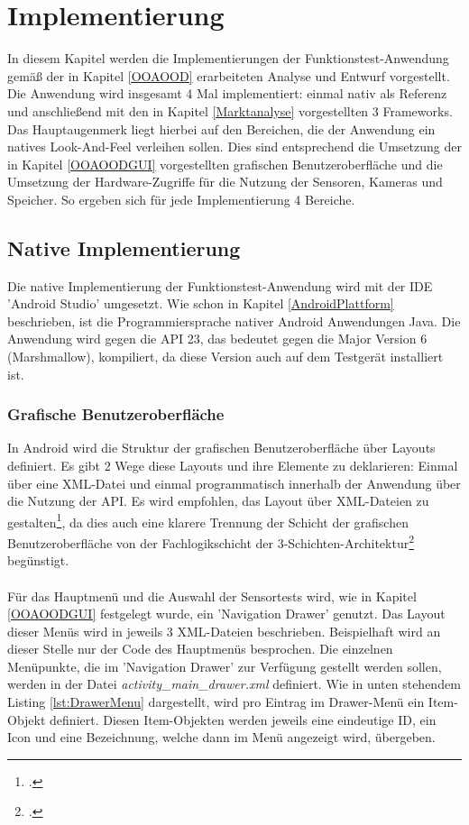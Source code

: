 \chapter{Implementierung}

In diesem Kapitel werden die Implementierungen der Funktionstest-Anwendung gemäß der in Kapitel \ref{OOAOOD} erarbeiteten Analyse und Entwurf vorgestellt. Die Anwendung wird insgesamt 4 Mal implementiert: einmal nativ als Referenz und anschließend mit den in Kapitel \ref{Marktanalyse}  vorgestellten 3 Frameworks. Das Hauptaugenmerk liegt hierbei auf den Bereichen, die der Anwendung ein natives Look-And-Feel verleihen sollen. Dies sind entsprechend die Umsetzung der in Kapitel \ref{OOAOODGUI} vorgestellten grafischen Benutzeroberfläche und die Umsetzung der Hardware-Zugriffe für die Nutzung der Sensoren, Kameras und Speicher. So ergeben sich für jede Implementierung 4 Bereiche.

\section{Native Implementierung}

Die native Implementierung der Funktionstest-Anwendung wird mit der IDE 'Android Studio' umgesetzt. Wie schon in Kapitel \ref{AndroidPlattform} beschrieben, ist die Programmiersprache nativer Android Anwendungen Java. Die Anwendung wird gegen die API 23, das bedeutet gegen die Major Version 6 (Marshmallow), kompiliert, da diese Version auch auf dem Testgerät installiert ist. 

\subsection*{Grafische Benutzeroberfläche} \label{natImplGUI}

In Android wird die Struktur der grafischen Benutzeroberfläche über Layouts definiert. Es gibt 2 Wege diese Layouts und ihre Elemente zu deklarieren: Einmal über eine XML-Datei und einmal programmatisch innerhalb der Anwendung über die Nutzung der API. Es wird empfohlen, das Layout über XML-Dateien zu gestalten\footcite{AndroidAPI}, da dies auch eine klarere Trennung der Schicht der grafischen Benutzeroberfläche von der Fachlogikschicht der 3-Schichten-Architektur\footcite{SWTBalzert} begünstigt. 
\\
\\
Für das Hauptmenü und die Auswahl der Sensortests wird, wie in Kapitel \ref{OOAOODGUI} festgelegt wurde, ein 'Navigation Drawer' genutzt. Das Layout dieser Menüs wird in jeweils 3 XML-Dateien beschrieben. Beispielhaft wird an dieser Stelle nur der Code des Hauptmenüs besprochen. Die einzelnen Menüpunkte, die im 'Navigation Drawer' zur Verfügung gestellt werden sollen, werden in der Datei \textit{activity\_main\_drawer.xml} definiert. Wie in unten stehendem Listing \ref{lst:DrawerMenu} dargestellt, wird pro Eintrag im Drawer-Menü ein Item-Objekt definiert. Diesen Item-Objekten werden jeweils eine eindeutige ID, ein Icon und eine Bezeichnung, welche dann im Menü angezeigt wird, übergeben. 

